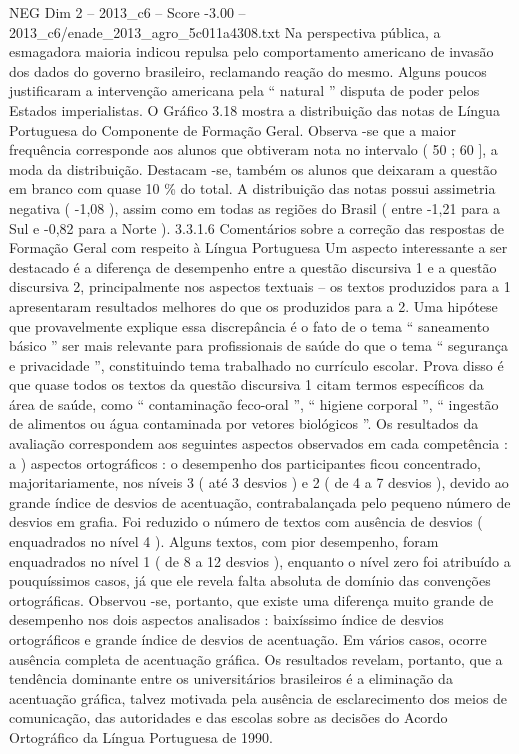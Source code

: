 \begin{textsample}{NEG Dim 2 – 2013\_c6 – Score -3.00 – 2013\_c6/enade\_2013\_agro\_5c011a4308.txt}
Na perspectiva pública, a esmagadora maioria indicou repulsa pelo comportamento americano de invasão dos dados do governo brasileiro, reclamando reação do mesmo.
Alguns poucos justificaram a intervenção americana pela “ natural ” disputa de poder pelos Estados imperialistas.
O Gráfico 3.18 mostra a distribuição das notas de Língua Portuguesa do Componente de Formação Geral.
Observa -se que a maior frequência corresponde aos alunos que obtiveram nota no intervalo ( 50 ; 60 ], a moda da distribuição.
Destacam -se, também os alunos que deixaram a questão em branco com quase 10 \% do total.
A distribuição das notas possui assimetria negativa ( -1,08 ), assim como em todas as regiões do Brasil ( entre -1,21 para a Sul e -0,82 para a Norte ). 3.3.1.6 Comentários sobre a correção das respostas de Formação Geral com respeito à Língua Portuguesa Um aspecto interessante a ser destacado é a diferença de desempenho entre a questão discursiva 1 e a questão discursiva 2, principalmente nos aspectos textuais – os textos produzidos para a 1 apresentaram resultados melhores do que os produzidos para a 2.
Uma hipótese que provavelmente explique essa discrepância é o fato de o tema “ saneamento básico ” ser mais relevante para profissionais de saúde do que o tema “ segurança e privacidade ”, constituindo tema trabalhado no currículo escolar.
Prova disso é que quase todos os textos da questão discursiva 1 citam termos específicos da área de saúde, como “ contaminação feco-oral ”, “ higiene corporal ”, “ ingestão de alimentos ou água contaminada por vetores biológicos ”.
Os resultados da avaliação correspondem aos seguintes aspectos observados em cada competência : a ) aspectos ortográficos : o desempenho dos participantes ficou concentrado, majoritariamente, nos níveis 3 ( até 3 desvios ) e 2 ( de 4 a 7 desvios ), devido ao grande índice de desvios de acentuação, contrabalançada pelo pequeno número de desvios em grafia.
Foi reduzido o número de textos com ausência de desvios ( enquadrados no nível 4 ).
Alguns textos, com pior desempenho, foram enquadrados no nível 1 ( de 8 a 12 desvios ), enquanto o nível zero foi atribuído a pouquíssimos casos, já que ele revela falta absoluta de domínio das convenções ortográficas.
Observou -se, portanto, que existe uma diferença muito grande de desempenho nos dois aspectos analisados : baixíssimo índice de desvios ortográficos e grande índice de desvios de acentuação.
Em vários casos, ocorre ausência completa de acentuação gráfica.
Os resultados revelam, portanto, que a tendência dominante entre os universitários brasileiros é a eliminação da acentuação gráfica, talvez motivada pela ausência de esclarecimento dos meios de comunicação, das autoridades e das escolas sobre as decisões do Acordo Ortográfico da Língua Portuguesa de 1990.

\end{textsample}
